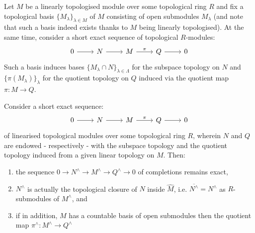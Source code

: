             \begin{remark}
                Let $M$ be a linearly topologised module over some topological ring $R$ and fix a topological basis $\{M_{\lambda}\}_{\lambda \in M}$ of $M$ consisting of open submodules $M_{\lambda}$ (and note that such a basis indeed exists thanks to $M$ being linearly topologised). At the same time, consider a short exact sequence of topological $R$-modules:
                    $$
                        \begin{tikzcd}
                        	0 & N & M & Q & 0
                        	\arrow[from=1-1, to=1-2]
                        	\arrow[from=1-2, to=1-3]
                        	\arrow["\pi", from=1-3, to=1-4]
                        	\arrow[from=1-4, to=1-5]
                        \end{tikzcd}
                    $$
                Such a basis induces bases $\{M_{\lambda} \cap N\}_{\lambda \in \Lambda}$ for the subspace topology on $N$ and $\{\pi(M_{\lambda})\}_{\lambda}$ for the quotient topology on $Q$ induced via the quotient map $\pi: M \to Q$. 
            \end{remark}
            \begin{proposition} \label{prop: completion_is_exact}
                Consider a short exact sequence:
                    $$
                        \begin{tikzcd}
                        	0 & N & M & Q & 0
                        	\arrow[from=1-1, to=1-2]
                        	\arrow[from=1-2, to=1-3]
                        	\arrow["\pi", from=1-3, to=1-4]
                        	\arrow[from=1-4, to=1-5]
                        \end{tikzcd}
                    $$
                of linearised topological modules over some topological ring $R$, wherein $N$ and $Q$ are endowed - respectively - with the subspace topology and the quotient topology induced from a given linear topology on $M$. Then:
                    \begin{enumerate}
                        \item the sequence $0 \to N^{\wedge} \to M^{\wedge} \to Q^{\wedge} \to 0$ of completions remains exact, 
                        \item $N^{\wedge}$ is actually the topological closure of $N$ inside $\hat{M}$, i.e. $\overline{N^{\wedge}} = N^{\wedge}$ as $R$-submodules of $M^{\wedge}$, and
                        \item if in addition, $M$ has a countable basis of open submodules then the quotient map $\pi^{\wedge}: M^{\wedge} \to Q^{\wedge}$
                    \end{enumerate}
            \end{proposition}
